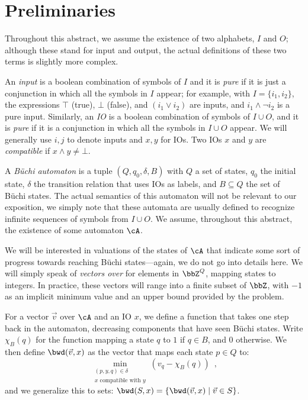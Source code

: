 \documentclass[sigconf,screen,nonacm]{acmart}
\begin{document}
\section{Preliminaries}

Throughout this abstract, we assume the existence of two alphabets, \(I\) and
\(O\); although these stand for input and output, the actual definitions of these
two terms is slightly more complex.

An \emph{input} is a boolean combination of symbols of \(I\) and it is \emph{pure}
if it is just a conjunction in which all the symbols in \(I\) appear; for example,
with \(I = \{i_1, i_2\}\), the expressions \(\top\) (true), \(\bot\) (false), and
\((i_1 \lor i_2)\) are inputs, and \(i_1 \land \neg i_2\) is a pure input.  Similarly,
an \emph{IO} is a boolean combination of symbols of \(I \cup O\), and it is
\emph{pure} if it is a conjunction in which all the symbols in \(I \cup O\) appear.
We will generally use \(i, j\) to denote inputs and \(x, y\) for IOs.  Two IOs
\(x\) and \(y\) are \emph{compatible} if \(x \land y \neq \bot\).

A \emph{Büchi automaton} \cA is a tuple \((Q, q_0, \delta, B)\) with \(Q\) a set of
states, \(q_0\) the initial state, \(\delta\) the transition relation that uses IOs as
labels, and \(B \subseteq Q\) the set of Büchi states.  The actual semantics of this
automaton will not be relevant to our exposition, we simply note that these
automata are usually defined to recognize infinite sequences of symbols from
\(I \cup O\).  We assume, throughout this abstract, the existence of some automaton
\(\cA\).

We will be interested in valuations of the states of \(\cA\) that indicate some
sort of progress towards reaching Büchi states---again, we do not go into details
here.  We will simply speak of \emph{vectors over \cA} for elements in
\(\bbZ^Q\), mapping states to integers.  In practice, these vectors will range
into a finite subset of \(\bbZ\), with \(-1\) as an implicit minimum value and an
upper bound provided by the problem.

For a vector \(\vec{v}\) over \(\cA\) and an IO \(x\), we define a function that takes
one step back in the automaton, decreasing components that have seen Büchi
states.  Write \(\chi_B(q)\) for the function mapping a state \(q\) to \(1\) if \(q \in B\),
and \(0\) otherwise.  We then define \(\bwd(\vec{v}, x)\) as the vector that maps
each state \(p \in Q\) to:
\[\min_{\substack{(p, y, q) \in \delta\\ x \text{ compatible with } y}} \left(v_q -
  \chi_B(q)\right)\enspace,\]
and we generalize this to sets: \(\bwd(S, x) = \{\bwd(\vec{v}, x) \mid \vec{v}
\in S\}\).
\end{document}
